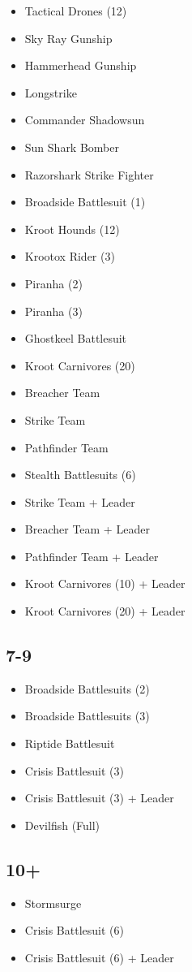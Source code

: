 \documentclass{HordeModeTarot}
\begin{document}
\begin{multicols}{2}
\begin{itemize}[leftmargin=*]
\item[] Tactical Drones (12)
\item[] Sky Ray Gunship
\item[] Hammerhead Gunship
\item[] Longstrike
\item[] Commander Shadowsun
\item[] Sun Shark Bomber
\item[] Razorshark Strike Fighter
\item[] Broadside Battlesuit (1)
\item[] Kroot Hounds (12)
\item[] Krootox Rider (3)
\item[] Piranha (2)
\item[] Piranha (3)
\item[] Ghostkeel Battlesuit
\item[] Kroot Carnivores (20)
\item[] Breacher Team
\item[] Strike Team
\item[] Pathfinder Team
\item[] Stealth Battlesuits (6)
\item[] Strike Team + Leader
\item[] Breacher Team + Leader
\item[] Pathfinder Team + Leader
\item[] Kroot Carnivores (10) + Leader
\item[] Kroot Carnivores (20) + Leader
\end{itemize}

\subsection*{7-9}

\begin{itemize}[leftmargin=*]
\item[] Broadside Battlesuits (2)
\item[] Broadside Battlesuits (3)
\item[] Riptide Battlesuit
\item[] Crisis Battlesuit (3)
\item[] Crisis Battlesuit (3) + Leader
\item[] Devilfish (Full)
\end{itemize}

\subsection*{10+}

\begin{itemize}[leftmargin=*]
\item[] Stormsurge
\item[] Crisis Battlesuit (6)
\item[] Crisis Battlesuit (6) + Leader
\end{itemize}


\end{multicols}
\end{document}
